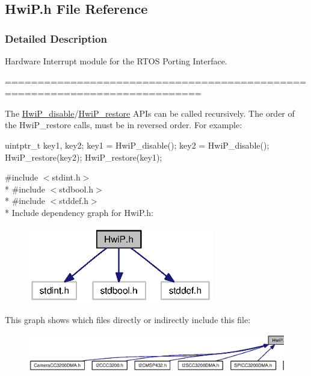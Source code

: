\subsection{Hwi\+P.\+h File Reference}
\label{_hwi_p_8h}


\subsubsection{Detailed Description}
Hardware Interrupt module for the R\+T\+O\+S Porting Interface. 

============================================================================

The \hyperlink{_hwi_p_8h_aac47ffab62f7d25d736b58e40be17425}{Hwi\+P\+\_\+disable}/\hyperlink{_hwi_p_8h_a979cdfbd9993f6c5eedef8570efbd62e}{Hwi\+P\+\_\+restore} A\+P\+Is can be called recursively. The order of the Hwi\+P\+\_\+restore calls, must be in reversed order. For example\+: 
\begin{DoxyCode}
uintptr\_t key1, key2;
key1 = HwiP_disable();
key2 = HwiP_disable();
HwiP_restore(key2);
HwiP_restore(key1);
\end{DoxyCode}
 

{\ttfamily \#include $<$stdint.\+h$>$}\\*
{\ttfamily \#include $<$stdbool.\+h$>$}\\*
{\ttfamily \#include $<$stddef.\+h$>$}\\*
Include dependency graph for Hwi\+P.\+h\+:
\nopagebreak
\begin{figure}[H]
\begin{center}
\leavevmode
\includegraphics[width=229pt]{_hwi_p_8h__incl}
\end{center}
\end{figure}
This graph shows which files directly or indirectly include this file\+:
\nopagebreak
\begin{figure}[H]
\begin{center}
\leavevmode
\includegraphics[width=350pt]{_hwi_p_8h__dep__incl}
\end{center}
\end{figure}
